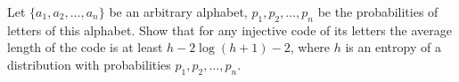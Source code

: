 Let $\{a_1, a_2, \dots, a_n\}$ be an arbitrary alphabet, $p_1, p_2, \dots, p_n$ be the probabilities of
letters of this alphabet. Show that for any injective code of its letters the average length of the code
is at least $h - 2 \log (h + 1) - 2$, where $h$ is an entropy of a distribution with probabilities $p_1,
p_2, \dots, p_n$.